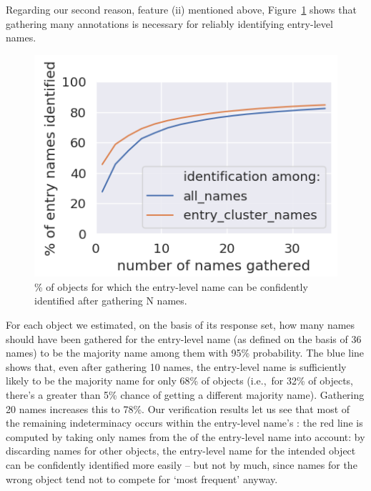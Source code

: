 Regarding our second reason, feature (ii) mentioned above, Figure~\ref{fig:entry-level-name-stability} shows that gathering many annotations is necessary for reliably identifying entry-level names.
\begin{figure}[t]
	\centering
	\includegraphics[width=.7\columnwidth]{images/stability_analytic.png}
	\caption{\% of objects for which the entry-level name can be confidently identified after gathering N names.}
	\label{fig:entry-level-name-stability}
\end{figure}
For each object we estimated, on the basis of its \mn response set, how many names should have been gathered for the entry-level name (as defined on the basis of 36 names) to be the majority name among them with 95\% probability.
The blue line shows that, even after gathering 10 names, the entry-level name is sufficiently likely to be the majority name for only 68\% of objects (i.e.,~for 32\% of objects, there's a greater than 5\% chance of getting a different majority name).
Gathering 20 names increases this to 78\%.
Our verification results let us see that most of the remaining indeterminacy occurs within the entry-level name's \cluster:
the red line is computed by taking only names from the \cluster of the entry-level name into account:
by discarding names for other objects, the entry-level name for the intended object can be confidently identified more easily -- but not by much, since names for the wrong object tend not to compete for `most frequent' anyway.

